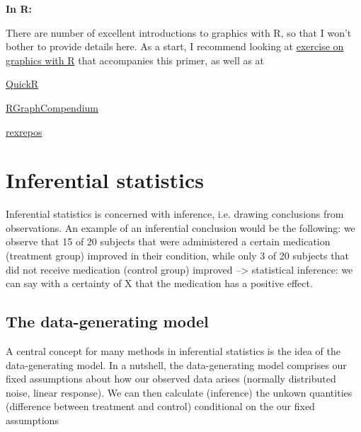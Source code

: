 \documentclass[a4paper,twoside]{tufte-book}\usepackage[]{graphicx}\usepackage[]{color}
\begin{document}
\vspace{1cm}
\begin{fullwidth}
\begin{mdframed}
    
\textbf{In R:} 

There are number of excellent introductions to graphics with R, so that I won't bother to provide details here. As a start, I recommend looking at \href{https://github.com/florianhartig/ResearchSkills/tree/master/Labs/Statistics/Practicals/GraphicsInR}{exercise on graphics with R} that accompanies this primer, as well as at 

\begin{itemize*}
  \item \href{http://www.statmethods.net/graphs/index.html}{QuickR}
  \item \href{http://shinyapps.org/apps/RGraphCompendium/index.php}{RGraphCompendium}
  \item \href{http://www.uni-kiel.de/psychologie/rexrepos/rerDiagrams.html}{rexrepos}
\end{itemize*}

\end{mdframed}
\end{fullwidth} 


\chapter{Inferential statistics}


Inferential statistics is concerned with inference, i.e. drawing conclusions from observations. An example of an inferential conclusion would be the following: we observe that 15 of 20 subjects that were administered a certain medication (treatment group) improved in their condition, while only 3 of 20 subjects that did not receive medication (control group) improved --> statistical inference: we can say with a certainty of X that the medication has a positive effect.  


\section{The data-generating model}


A central concept for many methods in inferential statistics is the idea of the data-generating model. In a nutshell, the data-generating model comprises our fixed assumptions about how our observed data arises (normally distributed noise, linear response). We can then calculate (inference) the unkown quantities (difference between treatment and control) conditional on the our fixed assumptions 
\end{document}
